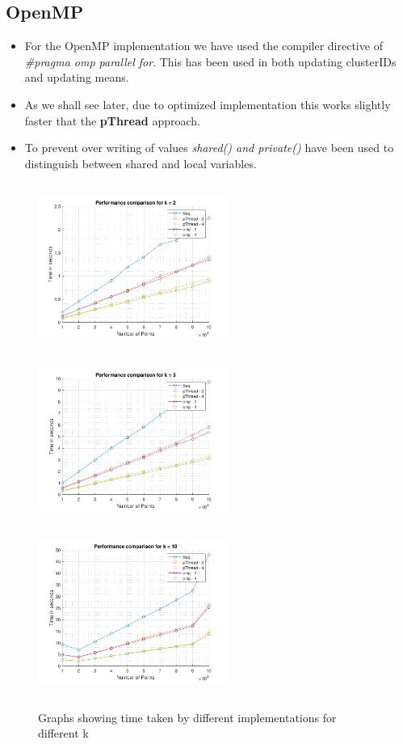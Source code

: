 \documentclass[a4paper, 11pt, margin=1in]{article}
\begin{document}
\subsection{OpenMP}

\begin{itemize}
    \item For the OpenMP implementation we have used the compiler directive of \textit{#pragma omp parallel for}. This has been used in both updating clusterIDs and updating means.
    \item As we shall see later, due to optimized implementation this works slightly faster that the \textbf{pThread} approach.
    \item To prevent over writing of values \textit{shared() and private()} have been used to distinguish between shared and local variables.
\end{itemize}

\begin{figure}[H]
    \centering
    \includegraphics[width=6.2cm,height=5.5cm]{k2}
    \includegraphics[width=6.2cm,height=5.5cm]{k5}
    \includegraphics[width=6.2cm,height=5.5cm]{k10}
    \caption{Graphs showing time taken by different implementations for different k}
    \label{fig:time}
\end{figure}
\end{document}
